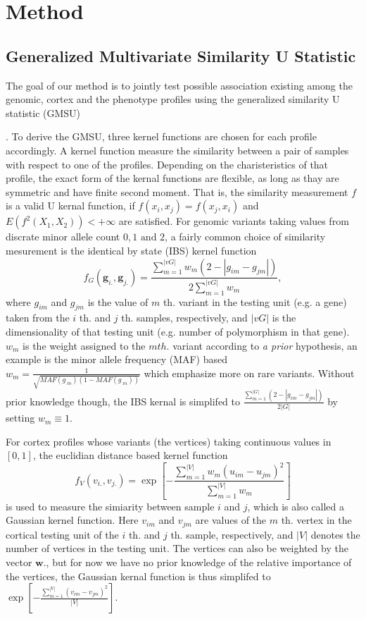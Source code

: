 \section{Method}

\subsection{Generalized Multivariate Similarity U Statistic}
The goal of our method is to jointly test possible association existing among the genomic, cortex and the phenotype profiles using the generalized similarity U statistic (GMSU) {\cite{UST1, UST2}. To derive the GMSU, three kernel functions are chosen for each profile accordingly. A kernel function measure the similarity between a pair of samples with respect to one of the profiles. Depending on the charisteristics of that profile, the exact form of the kernal functions are flexible, as long as thay are symmetric and have finite second moment. That is, the similarity measurement $f$ is a valid U kernal function, if $f(x_i,x_j)=f(x_j,x_i)$ and $E(f^2(X_1, X_2))<+\infty$ are satisfied.
\newcommand{\vg}{\boldsymbol{g}}
\newcommand{\vv}{\boldsymbol{v}}
\newcommand{\vy}{\boldsymbol{y}}
\newcommand{\vG}{\boldsymbol{G}}
\newcommand{\vV}{\boldsymbol{V}}
\newcommand{\vY}{\boldsymbol{Y}}
\newcommand{\vq}{\boldsymbol{q}}
For genomic variants taking values from discrate minor allele count ${0, 1 \textrm{ and } 2}$, a fairly common choice of similarity mesurement is the identical by state (IBS) kernel function
\label{eq:wSG}
\[ f_G(\vg_{i.}, \vg_{j.}) = \frac{\sum_{m=1}^{|vG|}{w_m(2 - |g_{im} - g_{jm}|)}} {2\sum_{m=1}^{|vG|}{w_m}}, \]
where $g_{im}$ and $g_{jm}$ is the value of $m$ th. variant in the testing unit (e.g. a gene) taken from the $i$ th. and $j$ th. samples, respectively, and $|vG|$ is the dimensionality of that testing unit (e.g. number of polymorphism in that gene). $w_m$ is the weight assigned to the $m th.$ variant according to \textit{a prior} hypothesis, an example is the minor allele frequency (MAF) based $w_m=\frac{1}{\sqrt{MAF(g_{.m})(1-MAF(g_{.m}))}}$ which emphasize more on rare variants. Without prior knowledge though, the IBS kernal is simplifed to $\frac{\sum_{m = 1}^{|G|}{(2-|g_{im} - g_{jm}|)}}{2|G|}$ by setting $w_m \equiv 1$.

For cortex profiles whose variants (the vertices) taking continuous values in $[0,1]$, the euclidian distance based kernel function
\label{eq:wSV}
\[ f_V(v_{i.},v_{j.}) = \exp{ [-\frac{\sum_{m=1}^{|V|}{w_m(u_{im}-u_{jm})^2}} {\sum_{m=1}^{|V|}{w_m}}] } \]
is used to measure the simiarity between sample $i$ and $j$, which is also called a Gaussian kernel function. Here $v_{im}$ and $v_{jm}$ are values of the $m$ th. vertex in the cortical testing unit of the $i$ th. and $j$ th. sample, respectively, and $|V|$ denotes the number of vertices in the testing unit. The vertices can also be weighted by the vector $\boldsymbol{w}.$, but for now we have no prior knowledge of the relative importance of the vertices, the Gaussian kernal function is thus simplifed to $\exp{[-\frac{\sum_{m=1}^{|V|}{(v_{im}-v_{jm})^2}} {|V|}]}$.

}
